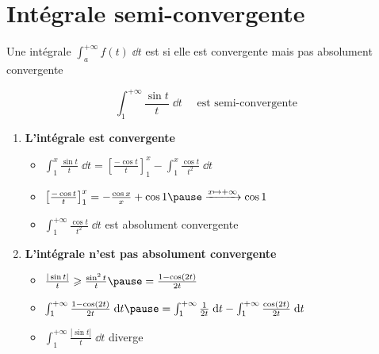 \section*{Intégrale semi-convergente}

\begin{frame}
\begin{mydefinition}
Une intégrale $\int_a^{+\infty} f(t)\;\dd t$ est  si 
elle est convergente mais pas absolument convergente
\end{mydefinition}
\pause

\begin{exemple}
$$\int_1^{+\infty} \frac{\sin t }{t}\;\dd t \quad\text{ est semi-convergente}$$
\pause
\vspace*{-2ex}
\begin{enumerate}

  
  \item \textbf{L'intégrale est convergente}

  \begin{itemize}
    \item $\int_1^x \frac{\sin t}{t}\;\dd t  = \left[\frac{-\cos t}{t}\right]_1^x
-  \int_1^x \frac{\cos t}{t^2}\;\dd t$
\pause  
    \item $\left[\frac{-\cos t}{t}\right]_1^x = -\frac{\cos x}{x}+\cos 1 \pause\xrightarrow{x\mapsto +\infty} \cos 1$
\pause
        
    \item $\int_1^{+\infty} \frac{\cos t}{t^2}\;\dd t$ est absolument convergente        
  \end{itemize}


 \pause
 
  \item \textbf{L'intégrale n'est pas absolument convergente}
   \pause
  \begin{itemize}
    \item $\frac{|\sin t|}{t} \ge \frac{\sin^2 t}{t} \pause= \frac{1-\cos(2t)}{2t}$
     \pause
    \item $\int_1^{+\infty}\frac{1-\cos(2t)}{2t}\;\dd t 
    \pause= \int_1^{+\infty}\frac{1}{2t}\;\dd t-\int_1^{+\infty}\frac{\cos(2t)}{2t}\;\dd t$ 
     \pause
    \item $\int_1^{+\infty}\frac{|\sin t|}{t}\;\dd t$ diverge
  \end{itemize}  

  
\end{enumerate}  
\end{exemple}

\end{frame}


